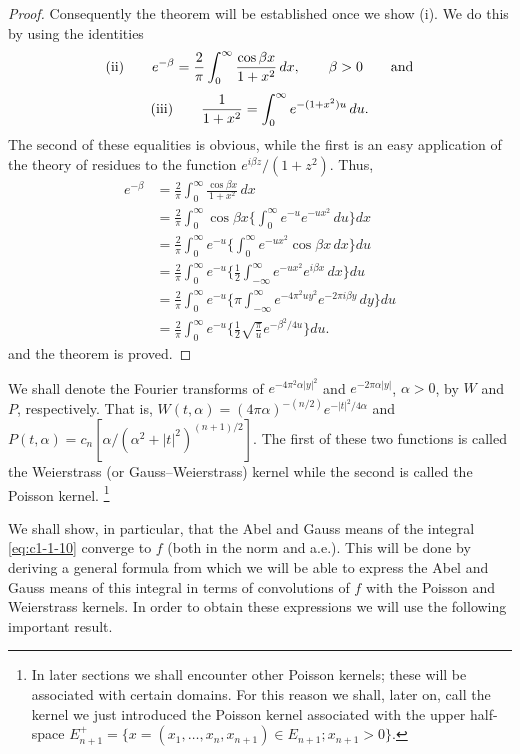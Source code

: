 \begin{proof}
Consequently the theorem will be established once we show (i). We do this by
using the identities
\[
\textup{(ii)}\qquad
e^{-\beta}=\frac{2}{\pi}\int_{0}^{\infty}\frac{\cos\beta x}{1+x^{2}}\,dx,\qquad\beta>0
\qquad\text{and}
\]
\[
\textup{(iii)}\qquad
\frac{1}{1+x^{2}}=\int_{0}^{\infty}e^{-(1+x^{2})u}\,du.
\]
The second of these equalities is obvious, while the first is an easy
application of the theory of residues to the function $e^{i\beta z}/(1 + z^{2})$.
Thus,
\begin{align*}
e^{-\beta}&=\frac{2}{\pi}\int_{0}^{\infty}\frac{\cos\beta x}{1+x^{2}}\,dx\\
&=\frac{2}{\pi}\int_{0}^{\infty}\cos\beta x\Biggl\{\int_{0}^{\infty}e^{-u}e^{-ux^{2}}\,du\Biggr\}dx\\
&=\frac{2}{\pi}\int_{0}^{\infty}e^{-u}\Biggl\{\int_{0}^{\infty}e^{-ux^{2}}\cos\beta x\,dx\Biggr\}du\\
&=\frac{2}{\pi}\int_{0}^{\infty}e^{-u}\Biggl\{\frac{1}{2}\int_{-\infty}^{\infty}e^{-ux^{2}}e^{i\beta x}\,dx\Biggr\}du\\
&=\frac{2}{\pi}\int_{0}^{\infty}e^{-u}\Biggl\{\pi\int_{-\infty}^{\infty}e^{-4\pi^{2}uy^{2}}e^{-2\pi i\beta y}\,dy\Biggr\}du\\
&=\frac{2}{\pi}\int_{0}^{\infty}e^{-u}\Biggl\{\frac{1}{2}\sqrt{\frac{\pi}{u}}e^{-\beta^{2}/4u}\Biggr\}du.
\end{align*}
and the theorem is proved.
\end{proof}

We shall denote the Fourier transforms of $e^{-4\pi^{2}\alpha|y|^{2}}$ and
$e^{-2\pi\alpha|y|}$, $\alpha > 0$, by $W$ and $P$, respectively. That is,
$W(t, \alpha) = (4\pi\alpha)^{-(n/2)}e^{-|t|^{2}/4\alpha}$ and
$P(t, \alpha) = c_{n}[\alpha/(\alpha^{2} + |t|^{2})^{(n+1)/2}]$. The first of
these two functions is called the Weierstrass (or Gauss--Weierstrass) kernel
while the second is called the Poisson kernel.%
\footnote{In later sections we shall encounter other Poisson kernels; these
will be associated with certain domains. For this reason we shall, later on,
call the kernel we just introduced the Poisson kernel associated with the upper
half-space
$E_{n+1}^{+}=\{x=(x_{1},\ldots,x_{n},x_{n+1})\in E_{n+1};x_{n+1}>0\}$.}

We shall show, in particular, that the Abel and Gauss means of the integral
\eqref{eq:c1-1-10} converge to $f$ (both in the norm and a.e.). This will be
done by deriving a general formula from which we will be able to express the
Abel and Gauss means of this integral in terms of convolutions of $f$ with the
Poisson and Weierstrass kernels. In order to obtain these expressions we will
use the following important result.

